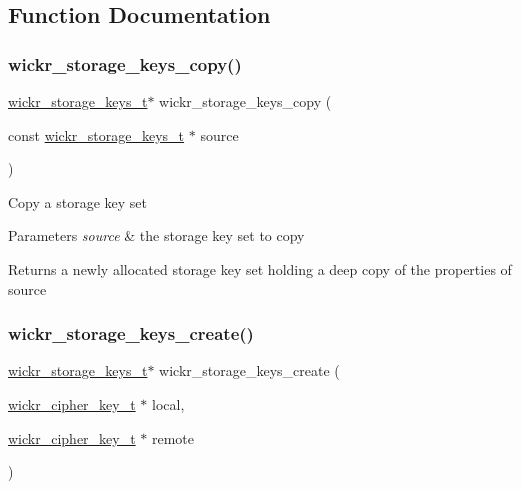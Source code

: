 \subsection{Function Documentation}
\mbox{\label{group__wickr__storage__keys_gad6839a21bca1c28775d51deb6b7c3835}} 
\subsubsection{\texorpdfstring{wickr\+\_\+storage\+\_\+keys\+\_\+copy()}{wickr\_storage\_keys\_copy()}}
{\footnotesize\ttfamily \hyperlink{structwickr__storage__keys}{wickr\+\_\+storage\+\_\+keys\+\_\+t}$\ast$ wickr\+\_\+storage\+\_\+keys\+\_\+copy (\begin{DoxyParamCaption}\item[{const \hyperlink{structwickr__storage__keys}{wickr\+\_\+storage\+\_\+keys\+\_\+t} $\ast$}]{source }\end{DoxyParamCaption})}

Copy a storage key set


\begin{DoxyParams}{Parameters}
{\em source} & the storage key set to copy \\
\hline
\end{DoxyParams}
\begin{DoxyReturn}{Returns}
a newly allocated storage key set holding a deep copy of the properties of \textquotesingle{}source\textquotesingle{} 
\end{DoxyReturn}
\mbox{\label{group__wickr__storage__keys_gad03ddd5ea10633ca35097e5f4707d5cb}} 
\subsubsection{\texorpdfstring{wickr\+\_\+storage\+\_\+keys\+\_\+create()}{wickr\_storage\_keys\_create()}}
{\footnotesize\ttfamily \hyperlink{structwickr__storage__keys}{wickr\+\_\+storage\+\_\+keys\+\_\+t}$\ast$ wickr\+\_\+storage\+\_\+keys\+\_\+create (\begin{DoxyParamCaption}\item[{\hyperlink{structwickr__cipher__key}{wickr\+\_\+cipher\+\_\+key\+\_\+t} $\ast$}]{local,  }\item[{\hyperlink{structwickr__cipher__key}{wickr\+\_\+cipher\+\_\+key\+\_\+t} $\ast$}]{remote }\end{DoxyParamCaption})}

